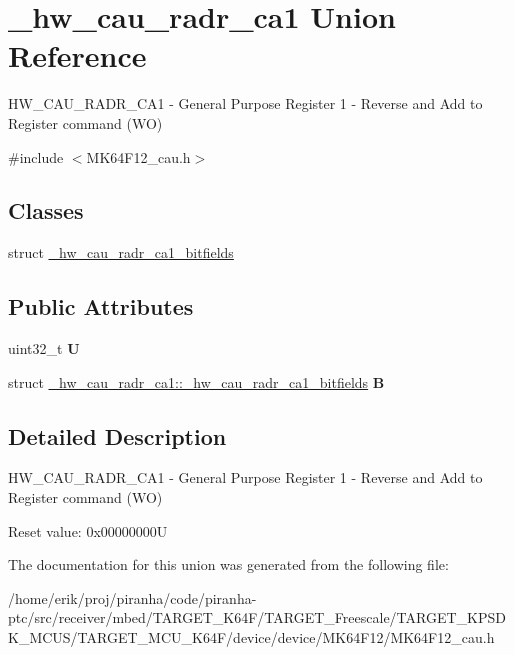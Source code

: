 \hypertarget{union__hw__cau__radr__ca1}{}\section{\+\_\+hw\+\_\+cau\+\_\+radr\+\_\+ca1 Union Reference}
\label{union__hw__cau__radr__ca1}


H\+W\+\_\+\+C\+A\+U\+\_\+\+R\+A\+D\+R\+\_\+\+C\+A1 -\/ General Purpose Register 1 -\/ Reverse and Add to Register command (WO)  




{\ttfamily \#include $<$M\+K64\+F12\+\_\+cau.\+h$>$}

\subsection*{Classes}
\begin{DoxyCompactItemize}
\item 
struct \hyperlink{struct__hw__cau__radr__ca1_1_1__hw__cau__radr__ca1__bitfields}{\+\_\+hw\+\_\+cau\+\_\+radr\+\_\+ca1\+\_\+bitfields}
\end{DoxyCompactItemize}
\subsection*{Public Attributes}
\begin{DoxyCompactItemize}
\item 
uint32\+\_\+t {\bfseries U}\hypertarget{union__hw__cau__radr__ca1_a424048793d1a9c9eecd3cd0c001bdb5f}{}\label{union__hw__cau__radr__ca1_a424048793d1a9c9eecd3cd0c001bdb5f}

\item 
struct \hyperlink{struct__hw__cau__radr__ca1_1_1__hw__cau__radr__ca1__bitfields}{\+\_\+hw\+\_\+cau\+\_\+radr\+\_\+ca1\+::\+\_\+hw\+\_\+cau\+\_\+radr\+\_\+ca1\+\_\+bitfields} {\bfseries B}\hypertarget{union__hw__cau__radr__ca1_ac1873483383fd0c714cf5f92557dc26d}{}\label{union__hw__cau__radr__ca1_ac1873483383fd0c714cf5f92557dc26d}

\end{DoxyCompactItemize}


\subsection{Detailed Description}
H\+W\+\_\+\+C\+A\+U\+\_\+\+R\+A\+D\+R\+\_\+\+C\+A1 -\/ General Purpose Register 1 -\/ Reverse and Add to Register command (WO) 

Reset value\+: 0x00000000U 

The documentation for this union was generated from the following file\+:\begin{DoxyCompactItemize}
\item 
/home/erik/proj/piranha/code/piranha-\/ptc/src/receiver/mbed/\+T\+A\+R\+G\+E\+T\+\_\+\+K64\+F/\+T\+A\+R\+G\+E\+T\+\_\+\+Freescale/\+T\+A\+R\+G\+E\+T\+\_\+\+K\+P\+S\+D\+K\+\_\+\+M\+C\+U\+S/\+T\+A\+R\+G\+E\+T\+\_\+\+M\+C\+U\+\_\+\+K64\+F/device/device/\+M\+K64\+F12/M\+K64\+F12\+\_\+cau.\+h\end{DoxyCompactItemize}
